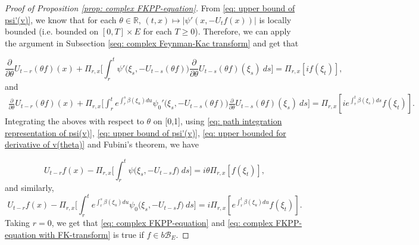 \documentclass[12pt]{amsart}
\theoremstyle{plain}
\theoremstyle{definition}
\numberwithin{equation}{section}
\begin{document}
\begin{proof}[Proof of Proposition \ref{prop: complex FKPP-equation}]
    From \eqref{eq: upper bound of psi'(v)}, we know that for each $\theta\in \mathbb R$, $(t,x) \mapsto |\psi'(x,-U_tf(x))|$ is locally bounded (i.e. bounded on $[0,T]\times E$ for each $T \geq 0$).
    Therefore, we can apply the argument in Subsection \ref{seq: complex Feynman-Kac transform} and get that

\[
    \frac{\partial}{\partial \theta} U_{t-r}(\theta f)(x) + \Pi_{r,x} \Big[\int_r^t \psi'\big(\xi_s,- U_{t-s}(\theta f)\big)\frac{\partial}{\partial \theta} U_{t-s}(\theta f)(\xi_s)~ds\Big]
    = \Pi_{r,x} [i f(\xi_t)],
\]
    and
\begin{align}
    \frac{\partial}{\partial \theta} U_{t-r}(\theta f)(x) + \Pi_{r,x} \Big[\int_r^t e^{\int_r^s \beta(\xi_u)du}\psi_0'\big(\xi_s,- U_{t-s}(\theta f)\big)\frac{\partial}{\partial \theta} U_{t-s}(\theta f)(\xi_s)~ds\Big]
    = \Pi_{r,x} [i e^{\int_r^t \beta(\xi_s)ds}f(\xi_t)].
\end{align}
    Integrating the aboves with respect to $\theta$  on [0,1], using \eqref{eq: path integration representation of psi(v)}, \eqref{eq: upper bound of psi'(v)}, \eqref{eq: upper bounded for derivative of v(theta)} and Fubini's theorem, we have

\begin{equation}
    U_{t-r}f(x) - \Pi_{r,x} \Big[\int_r^t \psi\big(\xi_s,-U_{t-s}f\big) ~ds\Big]
    = i\theta \Pi_{r,x} [f(\xi_t)],
\end{equation}
    and similarly,
\begin{equation}
    U_{t-r}f(x) - \Pi_{r,x} \Big[\int_r^t e^{\int_r^s \beta(\xi_u)du} \psi_0\big(\xi_s,- U_{t-s}f\big) ~ds\Big]
    = i\Pi_{r,x} [e^{\int_r^t\beta(\xi_u)du}f(\xi_t)].
\end{equation}
    Taking $r = 0$, we get that \eqref{eq: complex FKPP-equation} and \eqref{eq: complex FKPP-equation with FK-transform} is true if $f\in b\mathscr B_E$.


\end{proof}
\end{document}
